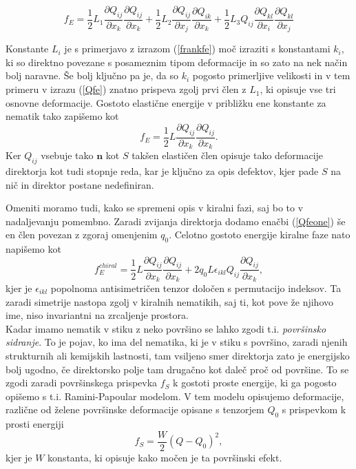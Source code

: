 \documentclass[longbibliography,slovene,a4paper,12pt]{book}
\begin{document}
\begin{equation}
f_E = \frac{1}{2} L_1 \frac{\partial Q_{ij}}{\partial x_k}\frac{\partial Q_{ij}}{\partial x_k} + \frac{1}{2} L_2  \frac{\partial Q_{ij}}{\partial x_j}\frac{\partial Q_{ik}}{\partial x_k} + \frac{1}{2}L_3Q_{ij}  \frac{\partial Q_{kl}}{\partial x_i}\frac{\partial Q_{kl}}{\partial x_j}
\label{Qfe}
\end{equation}

Konstante $L_i$ je s primerjavo z izrazom (\ref{frankfe}) moč izraziti s konstantami $k_i$, ki so direktno povezane s posameznim tipom deformacije in so zato na nek način bolj naravne. Še bolj ključno pa je, da so $k_i$ pogosto primerljive velikosti in v tem primeru v izrazu (\ref{Qfe}) znatno prispeva zgolj prvi člen z $L_1$, ki opisuje vse tri osnovne deformacije. Gostoto elastične energije v približku ene konstante za nematik tako zapišemo kot
\begin{equation}
f_E = \frac{1}{2} L \frac{\partial Q_{ij}}{\partial x_k}\frac{\partial Q_{ij}}{\partial x_k}.
\label{Qfeone}
\end{equation}
Ker $Q_{ij}$ vsebuje tako $\mathbf{n}$ kot $S$ takšen elastičen člen opisuje tako deformacije direktorja kot tudi stopnje reda, kar je ključno za opis defektov, kjer pade $S$ na nič in direktor postane nedefiniran. 

Omeniti moramo tudi, kako se spremeni opis v kiralni fazi, saj bo to v nadaljevanju pomembno. Zaradi zvijanja direktorja dodamo enačbi (\ref{Qfeone}) še en člen povezan z zgoraj omenjenim $q_0$. Celotno gostoto energije kiralne faze nato napišemo kot
\begin{equation}
f^{chiral}_{E} =  \frac{1}{2} L \frac{\partial Q_{ij}}{\partial x_k}\frac{\partial Q_{ij}}{\partial x_k} + 2q_0L\epsilon_{ikl}Q_{ij}\frac{\partial Q_{ij}}{\partial x_k},
\label{chiralfe}
\end{equation}
kjer je $\epsilon_{ikl}$ popolnoma antisimetričen tenzor določen s permutacijo indeksov. Ta zaradi simetrije nastopa zgolj v kiralnih nematikih, saj ti, kot pove že njihovo ime, niso invariantni na zrcaljenje prostora.\\

Kadar imamo nematik v stiku z neko površino se lahko zgodi t.i. \emph{površinsko sidranje}. To je pojav, ko ima del nematika, ki je v stiku s površino, zaradi njenih strukturnih ali kemijskih lastnosti, tam vsiljeno smer direktorja zato je energijsko bolj ugodno, če direktorsko polje tam drugačno kot daleč proč od površine. To se zgodi zaradi površinskega prispevka $f_S$ k gostoti proste energije, ki ga pogosto opišemo s t.i. Ramini-Papoular modelom. V tem modelu opisujemo deformacije, različne od želene površinske deformacije opisane s tenzorjem $Q_0$ s prispevkom k prosti energiji
\begin{equation}
f_S = \frac{W}{2}(Q-Q_0)^2,
\end{equation}
kjer je $W$ konstanta, ki opisuje kako močen je ta površinski efekt. \\
\end{document}
